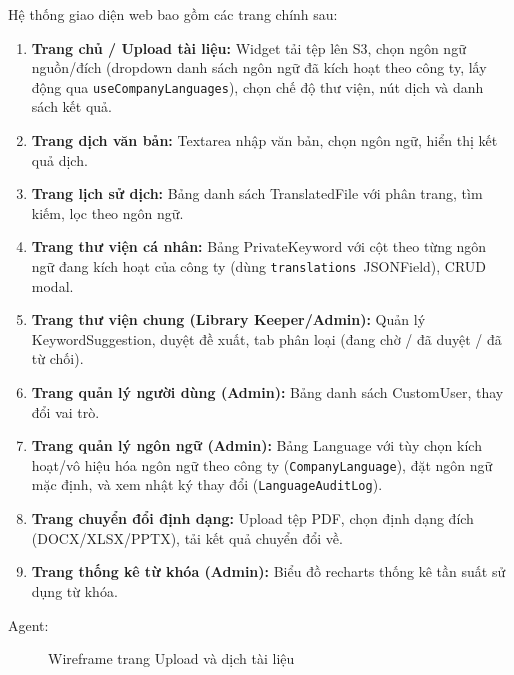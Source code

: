 Hệ thống giao diện web bao gồm các trang chính sau:

\begin{enumerate}
  \item \textbf{Trang chủ / Upload tài liệu:} Widget tải tệp lên S3, chọn ngôn ngữ nguồn/đích
    (dropdown danh sách ngôn ngữ đã kích hoạt theo công ty, lấy động qua
    \texttt{useCompanyLanguages}), chọn chế độ thư viện, nút dịch và danh sách kết quả.
  \item \textbf{Trang dịch văn bản:} Textarea nhập văn bản, chọn ngôn ngữ, hiển thị kết quả
    dịch.
  \item \textbf{Trang lịch sử dịch:} Bảng danh sách TranslatedFile với phân trang, tìm kiếm,
    lọc theo ngôn ngữ.
  \item \textbf{Trang thư viện cá nhân:} Bảng PrivateKeyword với cột theo từng ngôn ngữ đang
    kích hoạt của công ty (dùng \texttt{translations}~JSONField), CRUD modal.
  \item \textbf{Trang thư viện chung (Library Keeper/Admin):} Quản lý KeywordSuggestion, duyệt
    đề xuất, tab phân loại (đang chờ / đã duyệt / đã từ chối).
  \item \textbf{Trang quản lý người dùng (Admin):} Bảng danh sách CustomUser, thay đổi vai trò.
  \item \textbf{Trang quản lý ngôn ngữ (Admin):} Bảng Language với tùy chọn kích hoạt/vô hiệu
    hóa ngôn ngữ theo công ty (\texttt{CompanyLanguage}), đặt ngôn ngữ mặc định, và xem nhật ký
    thay đổi (\texttt{LanguageAuditLog}).
  \item \textbf{Trang chuyển đổi định dạng:} Upload tệp PDF, chọn định dạng đích (DOCX/XLSX/PPTX),
    tải kết quả chuyển đổi về.
  \item \textbf{Trang thống kê từ khóa (Admin):} Biểu đồ recharts thống kê tần suất sử dụng
    từ khóa.
\end{enumerate}

Agent:

\begin{figure}[H]
\centering
{}
\caption{Wireframe trang Upload và dịch tài liệu}
\label{fig:ui_upload}
\end{figure}


